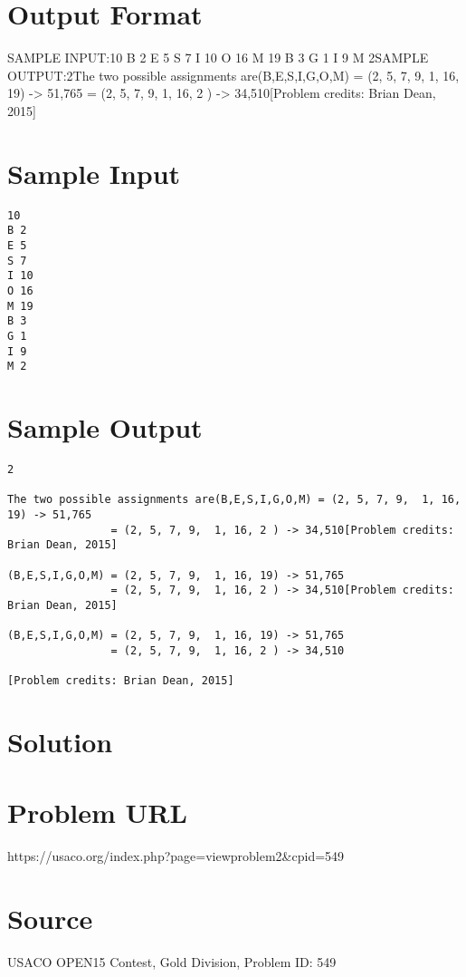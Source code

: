 \documentclass[12pt]{article}
\begin{document}
\section*{Output Format}
SAMPLE INPUT:10
B 2
E 5
S 7
I 10
O 16
M 19
B 3
G 1
I 9
M 2SAMPLE OUTPUT:2The two possible assignments are(B,E,S,I,G,O,M) = (2, 5, 7, 9,  1, 16, 19) -> 51,765
                = (2, 5, 7, 9,  1, 16, 2 ) -> 34,510[Problem credits: Brian Dean, 2015]

\section*{Sample Input}
\begin{verbatim}
10
B 2
E 5
S 7
I 10
O 16
M 19
B 3
G 1
I 9
M 2
\end{verbatim}

\section*{Sample Output}
\begin{verbatim}
2

The two possible assignments are(B,E,S,I,G,O,M) = (2, 5, 7, 9,  1, 16, 19) -> 51,765
                = (2, 5, 7, 9,  1, 16, 2 ) -> 34,510[Problem credits: Brian Dean, 2015]

(B,E,S,I,G,O,M) = (2, 5, 7, 9,  1, 16, 19) -> 51,765
                = (2, 5, 7, 9,  1, 16, 2 ) -> 34,510[Problem credits: Brian Dean, 2015]

(B,E,S,I,G,O,M) = (2, 5, 7, 9,  1, 16, 19) -> 51,765
                = (2, 5, 7, 9,  1, 16, 2 ) -> 34,510

[Problem credits: Brian Dean, 2015]
\end{verbatim}

\section*{Solution}


\section*{Problem URL}
https://usaco.org/index.php?page=viewproblem2&cpid=549

\section*{Source}
USACO OPEN15 Contest, Gold Division, Problem ID: 549
\end{document}
